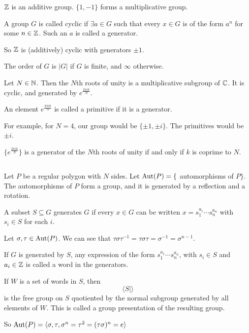 \documentclass[x11names,reqno,14pt]{extarticle}
\begin{document}
$\mathbb{Z}$ is an additive group. $\{1, -1\}$ forms a multiplicative group. 


A group $G$ is called cyclic if $\exists a \in G$ such that every $x \in G$ is of the form $a^n$ for some $n \in \mathbb{Z}$. Such an $a$ is called a generator. 

So $\mathbb{Z}$ is (additively) cyclic with generators $\pm 1$.


The order of $G$ is $|G|$ if $G$ is finite, and $\infty$ otherwise. 


Let $N \in \mathbb{N}$. Then the $N$th roots of unity is a multiplicative subgroup of $\mathbb{C}$. It is cyclic, and generated by $e^{\frac{2\pi i k}{N}}$. 

An element $e^{\frac{2\pi ik}{N}}$ is called a primitive if it is a generator. 

For example, for $N = 4$, our group would be $\{\pm 1, \pm i\}$. The primitives would be $\pm i$. 

$\{e^{\frac{2\pi i k}{N}}\}$ is a generator of the $N$th roots of unity if and only if $k$ is coprime to $N$. 

\subsection*{}

Let $P$ be a regular polygon with $N$ sides. Let ${\mathrm{Aut}}(P) = \{$ automorphisms of $P\}$. The automorphisms of $P$ form a group, and it is generated by a reflection and a rotation. 


A subset $S \subseteq G$ generates $G$ if every $x \in G$ can be written $x = s_1^{a_1}\cdots s_n^{a_n}$ with $s_i \in S$ for each $i$. 

Let $\sigma, \tau \in {\mathrm{Aut}}(P)$. We can see that $\tau\sigma\tau^{-1} = \tau\sigma\tau = \sigma^{-1} = \sigma^{n - 1}$. 

If $G$ is generated by $S$, any expression of the form $s_1^{a_1}\cdots s_n^{a_n}$, with $s_i \in S$ and $a_i \in \mathbb{Z}$ is called a word in the generators. 

If $W$ is a set of words in $S$, then 
\[
\langle S \mid \rangle
\]
is the free group on $S$ quotiented by the normal subgroup generated by all elements of $W$. This is called a group presentation of the resulting group. 

So ${\mathrm{Aut}}(P) = \langle \sigma, \tau, \sigma^n = \tau^2 = (\tau\sigma)^n = e\rangle$
\end{document}
